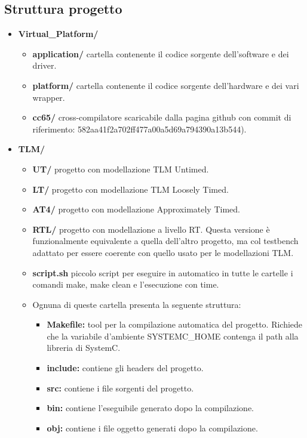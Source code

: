 \documentclass[]{IEEEtran}
\begin{document}
\subsection{Struttura progetto}
\begin{itemize}
    \item \textbf{Virtual\_Platform/}
          \begin{itemize}
              \item \textbf{application/} cartella contenente il codice sorgente dell'software e dei driver.
              \item \textbf{platform/} cartella contenente il codice sorgente dell'hardware e dei vari wrapper.
              \item \textbf{cc65/} cross-compilatore scaricabile dalla pagina github\cite{CC65} con commit di riferimento: 582aa41f2a702ff477a00a5d69a794390a13b544).
          \end{itemize}
    \item \textbf{TLM/}
          \begin{itemize}
              \item \textbf{UT/} progetto con modellazione TLM Untimed.
              \item \textbf{LT/} progetto con modellazione TLM Loosely Timed.
              \item \textbf{AT4/} progetto con modellazione Approximately Timed.
              \item \textbf{RTL/} progetto con modellazione a livello RT. Questa versione è funzionalmente equivalente a quella dell'altro progetto, ma col testbench adattato per essere coerente con quello usato per le modellazioni TLM.
              \item \textbf{script.sh} piccolo script per eseguire in automatico in tutte le cartelle i comandi make, make clean e l'esecuzione con time.
              \item Ognuna di queste cartella presenta la seguente struttura:
                    \begin{itemize}
                        \item \textbf{Makefile:} tool per la compilazione automatica del progetto. Richiede che la variabile d'ambiente SYSTEMC\_HOME contenga il path alla libreria di SystemC.
                        \item \textbf{include:} contiene gli headers del progetto.
                        \item \textbf{src:} contiene i file sorgenti del progetto.
                        \item \textbf{bin:} contiene l'eseguibile generato dopo la compilazione.
                        \item \textbf{obj:} contiene i file oggetto generati dopo la compilazione.
                    \end{itemize}
          \end{itemize}
\end{itemize}
\end{document}
